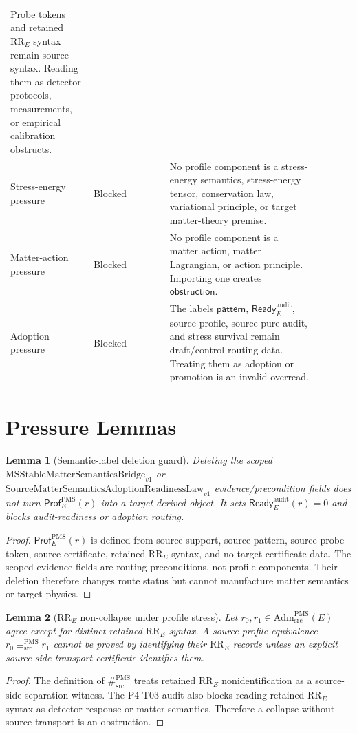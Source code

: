 \documentclass[11pt]{article}
\newcommand{\MSBridge}{\mathrm{MSStableMatterSemanticsBridge}_{v1}}
\newcommand{\SMSAR}{\mathrm{SourceMatterSemanticsAdoptionReadinessLaw}_{v1}}
\newcommand{\AdmPMS}{\mathrm{Adm}^{\mathrm{PMS}}_{\mathrm{src}}}
\newcommand{\Prof}{\mathsf{Prof}^{\mathrm{PMS}}_E}
\newcommand{\Ready}{\mathsf{Ready}^{\mathrm{audit}}_E}
\newcommand{\EqProf}{\equiv^{\mathrm{PMS}}_{\mathrm{src}}}
\newcommand{\SepProf}{\#^{\mathrm{PMS}}_{\mathrm{src}}}
\newcommand{\Pattern}{\mathsf{pattern}}
\newcommand{\Obstruction}{\mathsf{obstruction}}
\newcommand{\RRE}{\mathrm{RR}_E}
\newtheorem{lemma}{Lemma}
\begin{document}
\begin{longtable}{p{0.24\linewidth}p{0.22\linewidth}p{0.43\linewidth}}
Probe tokens and retained \(\RRE\) syntax remain source syntax. Reading them
as detector protocols, measurements, or empirical calibration obstructs. \\
Stress-energy pressure & Blocked &
No profile component is a stress-energy semantics, stress-energy tensor,
conservation law, variational principle, or target matter-theory premise. \\
Matter-action pressure & Blocked &
No profile component is a matter action, matter Lagrangian, or action
principle. Importing one creates \(\Obstruction\). \\
Adoption pressure & Blocked &
The labels \(\Pattern\), \(\Ready\), source profile, source-pure audit, and
stress survival remain draft/control routing data. Treating them as adoption
or promotion is an invalid overread. \\
\bottomrule
\end{longtable}

\section{Pressure Lemmas}

\begin{lemma}[Semantic-label deletion guard]
Deleting the scoped \(\MSBridge\) or \(\SMSAR\) evidence/precondition fields
does not turn \(\Prof(r)\) into a target-derived object. It sets
\(\Ready(r)=0\) and blocks audit-readiness or adoption routing.
\end{lemma}

\begin{proof}
\(\Prof(r)\) is defined from source support, source pattern, source
probe-token, source certificate, retained \(\RRE\) syntax, and no-target
certificate data. The scoped evidence fields are routing preconditions, not
profile components. Their deletion therefore changes route status but cannot
manufacture matter semantics or target physics.
\end{proof}

\begin{lemma}[\(\RRE\) non-collapse under profile stress]
Let \(r_0,r_1\in\AdmPMS(E)\) agree except for distinct retained
\(\RRE\) syntax. A source-profile equivalence \(r_0\EqProf r_1\) cannot be
proved by identifying their \(\RRE\) records unless an explicit source-side
transport certificate identifies them.
\end{lemma}

\begin{proof}
The definition of \(\SepProf\) treats retained \(\RRE\) nonidentification as a
source-side separation witness. The P4-T03 audit also blocks reading retained
\(\RRE\) syntax as detector response or matter semantics. Therefore a collapse
without source transport is an obstruction.
\end{proof}
\end{document}
